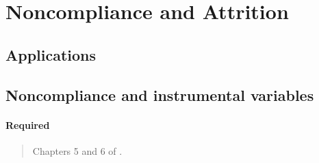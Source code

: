 \documentclass[12pt]{article}
\begin{document}
\begin{verse}  \end{verse}

\begin{verse}  \end{verse}

\begin{verse}  \end{verse}

\begin{verse}  \end{verse}


\begin{verse}  \end{verse}

\section{Noncompliance and Attrition}

\subsection*{Applications}

\begin{verse}  \end{verse}

\subsection{Noncompliance and instrumental variables}

\paragraph*{Required}

\begin{verse} Chapters 5 and 6 of . \end{verse}

\begin{verse}  \end{verse}

\begin{verse}
 \end{verse}
\end{document}
